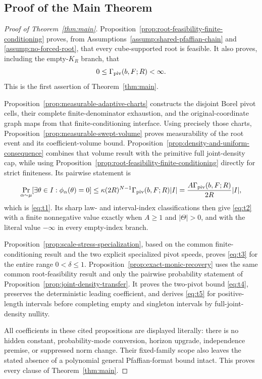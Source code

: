 \subsection{Proof of the Main Theorem}

\begin{proof}[Proof of Theorem~\ref{thm:main}]
Proposition~\ref{prop:root-feasibility-finite-conditioning} proves, from
Assumptions~\ref{assump:shared-pfaffian-chain} and
\ref{assump:no-forced-root}, that every cube-supported root is feasible.  It
also proves, including the empty-$K_R$ branch, that
\[
0\leq\Gamma_{\rm piv}(b,F;R)<\infty.
\]
This is the first assertion of Theorem~\ref{thm:main}.

Proposition~\ref{prop:measurable-adaptive-charts} constructs the disjoint
Borel pivot cells, their complete finite-denominator exhaustion, and the
original-coordinate graph maps from that finite-conditioning interface.
Using precisely those charts, Proposition~\ref{prop:measurable-swept-volume}
proves measurability of the root event and its coefficient-volume bound.
Proposition~\ref{prop:density-and-uniform-consequence} combines that volume
result with the primitive full joint-density cap, while using
Proposition~\ref{prop:root-feasibility-finite-conditioning} directly for
strict finiteness.  Its pairwise statement is
\[
\Pr_{\alpha\sim\mu}[\exists\theta\in I:\phi_\alpha(\theta)=0]
\leq\kappa(2R)^{N-1}\Gamma_{\rm piv}(b,F;R)|I|
=\frac{A\Gamma_{\rm piv}(b,F;R)}{2R}|I|,
\]
which is \eqref{eq:t1}.  Its sharp law- and interval-index classifications
then give \eqref{eq:t2} with a finite nonnegative value exactly when
$A\geq1$ and $|\Theta|>0$, and with the literal value $-\infty$ in every
empty-index branch.

Proposition~\ref{prop:scale-stress-specialization}, based on the common
finite-conditioning result and the two explicit specialized pivot speeds,
proves \eqref{eq:t3} for the entire range $0<\delta\leq1$.
Proposition~\ref{prop:exact-monic-recovery} uses the same common
root-feasibility result and only the pairwise probability statement of
Proposition~\ref{prop:joint-density-transfer}.  It proves the two-pivot
bound \eqref{eq:t4}, preserves the deterministic leading coefficient, and
derives \eqref{eq:t5} for positive-length intervals before completing empty
and singleton intervals by full-joint-density nullity.

All coefficients in these cited propositions are displayed literally:
there is no hidden constant, probability-mode conversion, horizon upgrade,
independence premise, or suppressed norm change.  Their fixed-family scope
also leaves the stated absence of a polynomial general Pfaffian-format
bound intact.  This proves every clause of Theorem~\ref{thm:main}.
\end{proof}
